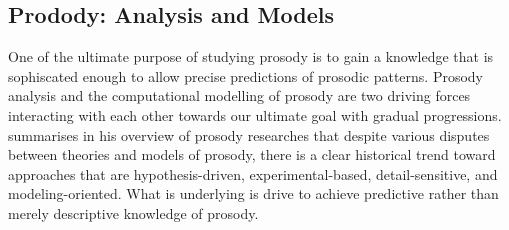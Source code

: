  
%
%
%
%

%

\subsection{Prodody: Analysis and Models}
One of the ultimate purpose of studying prosody is to gain a knowledge that is sophiscated enough to allow precise predictions of prosodic patterns. Prosody analysis and the computational modelling of prosody are two driving forces interacting with each other towards our ultimate goal with gradual progressions. \citet{Xu2015} summarises in his overview of prosody researches that despite various disputes between theories and models of prosody, there is a clear historical trend toward approaches that are hypothesis-driven, experimental-based, detail-sensitive, and modeling-oriented. What is underlying is drive to achieve predictive rather than merely descriptive knowledge of prosody. 

